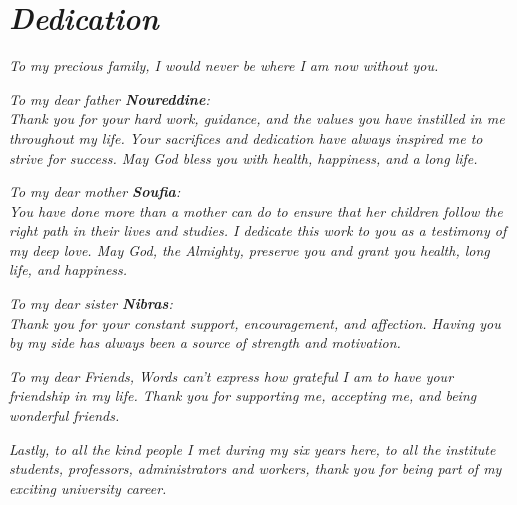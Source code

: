 \clearpage
\chapter*{{\emph{\huge{Dedication}}}}

\vspace{-2cm}

\begin{center}
    \emph{ To my precious family, I would never be where I am now without you.}
    
\end{center}

\begin{center}
    \emph{To my dear father \textbf{Noureddine}:\\
    Thank you for your hard work, guidance, and the values you have instilled in me throughout my life. Your sacrifices and dedication have always inspired me to strive for success. May God bless you with health, happiness, and a long life.}
\end{center}

\begin{center}
    \emph{To my dear mother \textbf{Soufia}:\\
    You have done more than a mother can do to ensure that her children follow the right path in their lives and studies. I dedicate this work to you as a testimony of my deep love. May God, the Almighty, preserve you and grant you health, long life, and happiness.}
\end{center}

\begin{center}
    \emph{To my dear sister \textbf{Nibras}:\\
    Thank you for your constant support, encouragement, and affection. Having you by my side has always been a source of strength and motivation.}
\end{center}

\begin{center}
    \emph{To my dear Friends, Words can’t express how grateful I am to have your friendship in my life. Thank you for supporting me, accepting me, and being wonderful friends.
    }
    
\end{center}

\begin{center}
    \emph{Lastly, to all the kind people I met during my six years here, to all the institute students, professors, administrators and workers, thank you for being part of my exciting university career. }
\end{center}  


